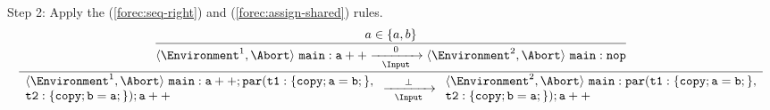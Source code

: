\noindent
Step 2: Apply the (\ref{forec:seq-right}) and (\ref{forec:assign-shared}) rules. 
\begin{equation*}
	\frac{
		\dfrac{
				a \in \lbrace a, b \rbrace
			}{
				\langle \Environment^1, \Abort \rangle ~ \mathtt{main: a++}
					\xrightarrow[~~\Input~~]{0} 
				\langle \Environment^2, \Abort \rangle ~ \mathtt{main: nop}
			}
		}{
			\begin{array}{l}
				\langle \Environment^1, \Abort \rangle ~ \mathtt{main: a++; par(t1:\{copy; a=b;\},}	\\
				\mathtt{t2:\{copy; b=a;\}); a++}													\\
			\end{array}
				\xrightarrow[~~\Input~~]{\bot} 
			\begin{array}{l}
				\langle \Environment^2, \Abort \rangle ~ \mathtt{main: par(t1:\{copy; a=b;\},}		\\
				\mathtt{t2:\{copy; b=a;\}); a++}													\\
			\end{array}
		}
\end{equation*}

